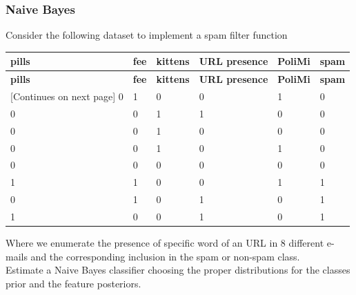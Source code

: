 \subsubsection{Naive Bayes}
    Consider the following dataset to implement a spam filter function
    \begin{tabularx}{\linewidth}{X|X|X|X|X|X}
        \toprule
        \textbf{pills} & \textbf{fee} & \textbf{kittens} & \textbf{URL presence} & \textbf{PoliMi} & \textbf{spam}\\
        \midrule
        \endfirsthead
        \toprule
        \textbf{pills} & \textbf{fee} & \textbf{kittens} & \textbf{URL presence} & \textbf{PoliMi} & \textbf{spam}\\
        \midrule
        \endhead
        \footnotesize [Continues on next page]
        \endfoot
        \bottomrule
        \endlastfoot
        0 & 1 & 0 & 0 & 1 & 0\\
        0 & 0 & 1 & 1 & 0 & 0\\
        0 & 0 & 1 & 0 & 0 & 0\\
        0 & 0 & 1 & 0 & 1 & 0\\
        0 & 0 & 0 & 0 & 0 & 0\\ \midrule
        1 & 1 & 0 & 0 & 1 & 1\\
        0 & 1 & 0 & 1 & 0 & 1\\
        1 & 0 & 0 & 1 & 0 & 1
    \end{tabularx}
    Where we enumerate the presence of specific word of an URL in 8 different e-mails and the corresponding inclusion in the spam or non-spam class.\\
    Estimate a Naive Bayes classifier choosing the proper distributions for the classes prior and the feature posteriors.


